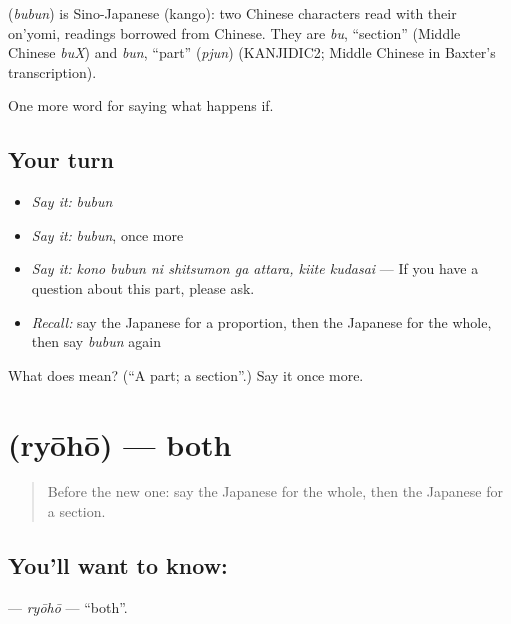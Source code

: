 \begin{cousinweb}
\textbf{} (\emph{bubun}) is Sino-Japanese (kango): two Chinese characters read with their on'yomi, readings borrowed from Chinese. They are \emph{bu}, \textquotedblleft{}section\textquotedblright{} (Middle Chinese \emph{buX}) and \emph{bun}, \textquotedblleft{}part\textquotedblright{} (\emph{pjun}) (KANJIDIC2; Middle Chinese in Baxter's transcription).
\end{cousinweb}

\begin{grammarlens}[title={What you've built}]
One more word for saying what happens if.
\end{grammarlens}

\subsection*{Your turn}
\begin{itemize}
\raggedright
  \item \emph{Say it:} \emph{bubun}
  \item \emph{Say it:} \emph{bubun}, once more
  \item \emph{Say it:} \emph{kono bubun ni shitsumon ga attara, kiite kudasai} — If you have a question about this part, please ask.
  \item \emph{Recall:} say the Japanese for a proportion, then the Japanese for the whole, then say \emph{bubun} again
\end{itemize}

\begin{tcolorbox}[breakable,colback=teal!4,colframe=teal!35!black,title={Before you move on}]
What does  mean? (\textquotedblleft{}A part; a section\textquotedblright{}.) Say it once more.
\end{tcolorbox}
\section[\texorpdfstring{\ja{りょうほう} (ryōhō)}{りょうほう (ryōhō)}]{ (ryōhō) — both}

\label{lesson:JA-C368-ryouhou}



\begin{quote}
Before the new one: say the Japanese for the whole, then the Japanese for a section.
\end{quote}

\subsection*{You'll want to know: }
\textbf{} — \emph{ryōhō} — \textquotedblleft{}both\textquotedblright{}.


